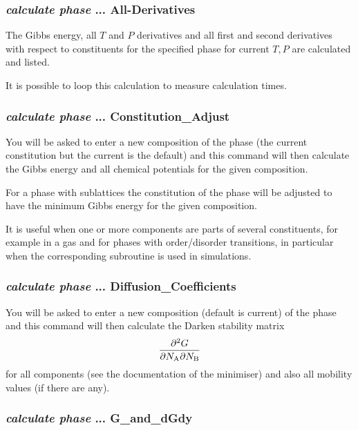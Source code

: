\documentclass[11pt]{article}
\begin{document}
\hypertarget{Calculate phase ... all-derivatives}{}
\hypertarget{Calculate phase ... loop}{}
\subsubsection{{\em calculate phase} ... All-Derivatives}

The Gibbs energy, all $T$ and $P$ derivatives and all first and second
derivatives with respect to constituents for the specified phase for
current $T,P$ are calculated and listed.

It is possible to loop this calculation to measure calculation times.

\hypertarget{Calculate phase adjust}{}
\subsubsection{{\em calculate phase} ... Constitution\_Adjust}

You will be asked to enter a new composition of the phase (the current
constitution but the current is the default) and this command will
then calculate the Gibbs energy and all chemical potentials for the
given composition.

For a phase with sublattices the constitution of the phase will be
adjusted to have the minimum Gibbs energy for the given composition.

It is useful when one or more components are parts of several
constituents, for example in a gas and for phases with order/disorder
transitions, in particular when the corresponding subroutine is used
in simulations.

\hypertarget{Calculate phase ... diffusion-coeff}{}
\subsubsection{{\em calculate phase} ... Diffusion\_Coefficients}

You will be asked to enter a new composition (default is current) of
the phase and this command will then calculate the Darken stability
matrix
\begin{eqnarray*}
  \frac{\partial^2 G}{\partial N_{\rm A}\partial N_{\rm B}}
\end{eqnarray*}
for all components (see the documentation of the minimiser) and also
all mobility values (if there are any).

\hypertarget{calculate phase ... G-and-dGdy}{}
\subsubsection{{\em calculate phase} ... G\_and\_dGdy}
\end{document}
